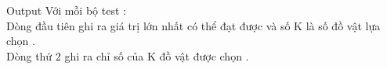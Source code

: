 Output
Với mỗi bộ test :
\\Dòng đầu tiên ghi ra giá trị lớn nhất có thể đạt được và số K là số đồ vật lựa chọn .
\\Dòng thứ 2 ghi ra chỉ số của K đồ vật được chọn .